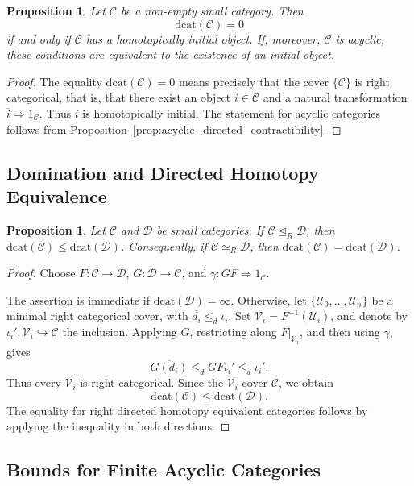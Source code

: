 \documentclass[12pt]{amsart}
\newtheorem{prop}[teo]{Proposition}
\newtheorem{proposition}[teo]{Proposition}
\theoremstyle{definition}
\theoremstyle{remark}
\numberwithin{figure}{section}%
\newcommand{\CC}{\mathcal{C}}
\newcommand{\Dc}{\mathcal{D}}
\newcommand{\Uc}{\mathcal{U}}
\newcommand{\Vc}{\mathcal{V}}
\begin{document}
\begin{proposition}\label{prop:dcat_zero}
Let \(\CC\) be a non-empty small category. Then
\[
\mathrm{dcat}(\CC)=0
\]
if and only if \(\CC\) has a homotopically initial object. If, moreover,
\(\CC\) is acyclic, these conditions are equivalent to the existence of an
initial object.
\end{proposition}

\begin{proof}
The equality \(\mathrm{dcat}(\CC)=0\) means precisely that the cover
\(\{\CC\}\) is right categorical, that is, that there exist an object
\(i\in\CC\) and a natural transformation
\(\overline{i}\Rightarrow1_\CC\). Thus \(i\) is homotopically initial.
The statement for acyclic categories follows from
Proposition~\ref{prop:acyclic_directed_contractibility}.
\end{proof}
\subsection{Domination and Directed Homotopy Equivalence}

\begin{prop}\label{prop:dcat_domination}
Let \(\CC\) and \(\Dc\) be small categories. If
\(\CC\unlhd_R\Dc\), then
\(\mathrm{dcat}(\CC)\leq\mathrm{dcat}(\Dc)\). Consequently, if
\(\CC\simeq_R\Dc\), then
\(\mathrm{dcat}(\CC)=\mathrm{dcat}(\Dc)\).
\end{prop}

\begin{proof}
Choose \(F\colon\CC\to\Dc\), \(G\colon\Dc\to\CC\), and
\(\gamma\colon GF\Rightarrow1_\CC\).

The assertion is immediate if \(\mathrm{dcat}(\Dc)=\infty\). Otherwise,
let \(\{\Uc_0,\ldots,\Uc_n\}\) be a minimal right categorical cover, with
\(\overline{d_i}\leq_d\iota_i\). Set
\(\Vc_i=F^{-1}(\Uc_i)\), and denote by
\(\iota_i'\colon\Vc_i\hookrightarrow\CC\) the inclusion. Applying \(G\),
restricting along \(F|_{\Vc_i}\), and then using \(\gamma\), gives
\[
\overline{G(d_i)}
\leq_d
GF\iota_i'
\leq_d
\iota_i'.
\]
Thus every \(\Vc_i\) is right categorical. Since the \(\Vc_i\) cover
\(\CC\), we obtain
\[
\mathrm{dcat}(\CC)\leq\mathrm{dcat}(\Dc).
\]
The equality for right directed homotopy equivalent categories follows by
applying the inequality in both directions.
\end{proof}

\subsection{Bounds for Finite Acyclic Categories}
\end{document}
